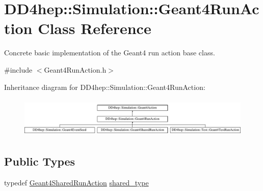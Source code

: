 \hypertarget{class_d_d4hep_1_1_simulation_1_1_geant4_run_action}{}\section{D\+D4hep\+:\+:Simulation\+:\+:Geant4\+Run\+Action Class Reference}
\label{class_d_d4hep_1_1_simulation_1_1_geant4_run_action}


Concrete basic implementation of the Geant4 run action base class.  




{\ttfamily \#include $<$Geant4\+Run\+Action.\+h$>$}

Inheritance diagram for D\+D4hep\+:\+:Simulation\+:\+:Geant4\+Run\+Action\+:\begin{figure}[H]
\begin{center}
\leavevmode
\includegraphics[height=1.964912cm]{class_d_d4hep_1_1_simulation_1_1_geant4_run_action}
\end{center}
\end{figure}
\subsection*{Public Types}
\begin{DoxyCompactItemize}
\item 
typedef \hyperlink{class_d_d4hep_1_1_simulation_1_1_geant4_shared_run_action}{Geant4\+Shared\+Run\+Action} \hyperlink{class_d_d4hep_1_1_simulation_1_1_geant4_run_action_a188fa9477fc65c6c825bf55abd0088e3}{shared\+\_\+type}
\end{DoxyCompactItemize}
